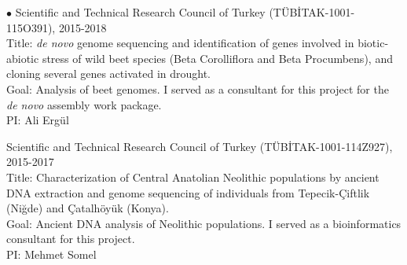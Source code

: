\documentclass[margin,line]{res}
\newenvironment{list2}{
  \begin{list}{$\bullet$}{%
      \setlength{\itemsep}{0.1cm}
      \setlength{\parsep}{0in} \setlength{\parskip}{0in}
      \setlength{\topsep}{0in} \setlength{\partopsep}{0in} 
      \setlength{\leftmargin}{0.2in}}}{\end{list}}
\begin{document}
\begin{resume}
\begin{list2}
                                         Scientific and Technical Research Council of Turkey (T\"{U}B\.{I}TAK-1001-115O391), 2015-2018\\
                                         Title: {\it de novo} genome sequencing and identification of genes involved in biotic-abiotic stress of wild beet species 
                                         (Beta Corolliflora and Beta Procumbens), and cloning several genes activated in drought.\\
                                         Goal: Analysis of beet genomes. I served as a consultant for this project for the {\it de novo} assembly work package.\\
                                         PI: Ali Ergül

                                        \item
                                         Scientific and Technical Research Council of Turkey (T\"{U}B\.{I}TAK-1001-114Z927), 2015-2017\\
                                         Title: Characterization of Central Anatolian Neolithic populations by ancient DNA extraction and genome sequencing of individuals 
                                         from Tepecik-Çiftlik (Niğde) and Çatalhöyük (Konya).\\
                                         Goal: Ancient DNA analysis of Neolithic populations. I served as a bioinformatics consultant for this project.\\
                                         PI: Mehmet Somel


\end{list2}
\end{resume}
\end{document}
